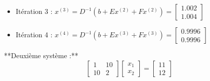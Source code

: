 \documentclass[10pt]{article}
\newenvironment{solution}
    {\par\vspace{0.5em}\begin{mdframed}[linewidth=0.5pt]\par}
    {\end{mdframed}\par\vspace{0.5em}}
\begin{document}
\begin{enumerate}
{\begin{solution}
\begin{itemize}
                \item[$\bullet$] Itération 3 : $x^{(3)} = D^{-1}(b + Ex^{(2)} + Fx^{(2)}) = \left[\begin{array}{c} 1.002 \\ 1.004 \end{array}\right]$
                \item[$\bullet$] Itération 4 : $x^{(4)} = D^{-1}(b + Ex^{(3)} + Fx^{(3)}) = \left[\begin{array}{c} 0.9996 \\ 0.9996 \end{array}\right]$
            \end{itemize}

            **Deuxième système :**
            \[
            \left[\begin{array}{cc}
            1 & 10 \\
            10 & 2
            \end{array}\right]\left[\begin{array}{l}
            x_1 \\
            x_2
            \end{array}\right]=\left[\begin{array}{l}
            11 \\
            12
            \end{array}\right]
            \]


\end{solution}}
\end{enumerate}
\end{document}
